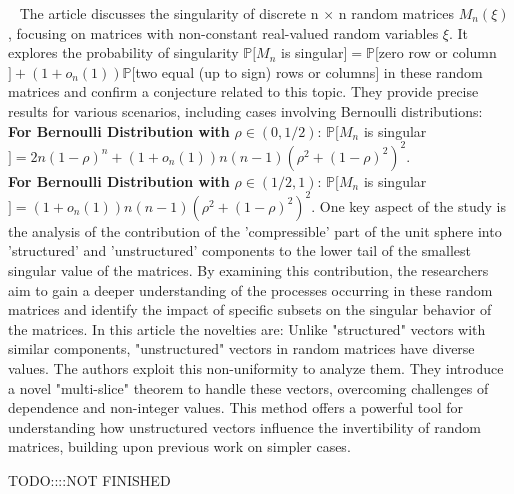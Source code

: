 ~\cite{jain2021singularity}
The article discusses the singularity of discrete n $\times$ n random matrices ${M_n}(\xi)$, focusing on matrices with non-constant real-valued random variables $\xi$. 
It explores the probability of singularity $ \mathbb{P}[M_n$ is singular$]=\mathbb{P}[$zero row or column$]+ (1+o_n(1))\mathbb{P}[$two equal (up to sign) rows or columns$]$ in these random matrices and confirm a conjecture related to this topic. 
They provide precise results for various scenarios, including cases involving Bernoulli distributions:\\
\textbf{For Bernoulli Distribution with} $\rho \in (0, 1/2)$:
$\mathbb{P}[M_n$ is singular$]=2n(1-\rho)^n + (1+o_n(1))n(n-1)(\rho^2+(1-\rho)^2)^2$.\\
\textbf{For Bernoulli Distribution with} $\rho \in (1/2, 1)$:
$\mathbb{P}[M_n$ is singular$]=(1+o_n(1))n(n-1)(\rho^2+(1-\rho)^2)^2$.
One key aspect of the study is the analysis of the contribution of the 'compressible' part of the unit sphere into 'structured' and 'unstructured' components to the lower tail of the smallest singular value of the matrices.
By examining this contribution, the researchers aim to gain a deeper understanding of the processes occurring in these random matrices and identify the impact of specific subsets on the singular behavior of the matrices.
In this article the novelties are:
Unlike "structured" vectors with similar components, "unstructured" vectors in random matrices have diverse values. The authors exploit this non-uniformity to analyze them. They introduce a novel "multi-slice" theorem to handle these vectors, overcoming challenges of dependence and non-integer values. This method offers a powerful tool for understanding how unstructured vectors influence the invertibility of random matrices, building upon previous work on simpler cases.


TODO::::NOT FINISHED